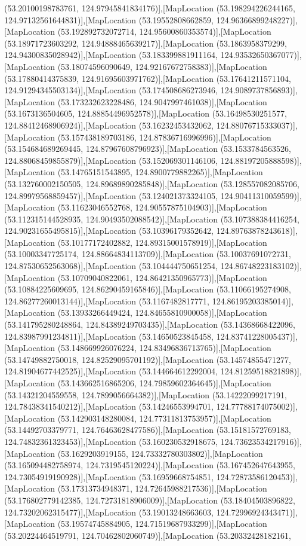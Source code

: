 (53.20100198783761, 124.97945841834176)],[MapLocation (53.198294226244165, 124.97132561644831)],[MapLocation (53.19552808662859, 124.96366899248227)],[MapLocation (53.192892732072714, 124.95600860353574)],[MapLocation (53.18971723603292, 124.94888465639217)],[MapLocation (53.1863958379299, 124.94300835028942)],[MapLocation (53.183399881911164, 124.93532650367077)],[MapLocation (53.18074596090649, 124.92167672758383)],[MapLocation (53.17880414375839, 124.91695603971762)],[MapLocation (53.17641211571104, 124.91294345503134)],[MapLocation (53.174508686273946, 124.9089737856893)],[MapLocation (53.173232623228486, 124.9047997461038)],[MapLocation (53.1673136504605, 124.88854496952578)],[MapLocation (53.16498530251577, 124.88412468906924)],[MapLocation (53.16232453432062, 124.88076715333037)],[MapLocation (53.157438189703186, 124.87836716996996)],[MapLocation (53.154684689269445, 124.87967608796923)],[MapLocation (53.1533784563526, 124.88068459855879)],[MapLocation (53.152069301146106, 124.88197205888598)],[MapLocation (53.14765151543895, 124.8900779882265)],[MapLocation (53.132760002150505, 124.89689890285848)],[MapLocation (53.128557082085706, 124.89979568859457)],[MapLocation (53.124021373324105, 124.90411310059599)],[MapLocation (53.11623046552768, 124.90557875104903)],[MapLocation (53.112315144528935, 124.90493502088542)],[MapLocation (53.107388384416254, 124.90231655495815)],[MapLocation (53.10396179352642, 124.89763878243618)],[MapLocation (53.10177172402882, 124.89315001578919)],[MapLocation (53.10003347725174, 124.88664834113709)],[MapLocation (53.10037691072731, 124.87530652563068)],[MapLocation (53.104444750651254, 124.86748223183102)],[MapLocation (53.10709040822061, 124.86421350965773)],[MapLocation (53.10884225609695, 124.86290459165846)],[MapLocation (53.11066195274908, 124.86277260013144)],[MapLocation (53.1167482817771, 124.86195203385014)],[MapLocation (53.13933266449424, 124.84655810900058)],[MapLocation (53.141795280248864, 124.84389249703435)],[MapLocation (53.14368668422096, 124.83987991234811)],[MapLocation (53.14650523845458, 124.83741228005437)],[MapLocation (53.148669926076224, 124.83496836713765)],[MapLocation (53.14749882750018, 124.82529095701192)],[MapLocation (53.14574855471277, 124.81904677442525)],[MapLocation (53.144664612292004, 124.81259518821898)],[MapLocation (53.143662516865206, 124.79859602364645)],[MapLocation (53.14321204559558, 124.7899056664382)],[MapLocation (53.14222099217191, 124.78438341540212)],[MapLocation (53.14246553994701, 124.77788174075002)],[MapLocation (53.142903148280084, 124.77311813753957)],[MapLocation (53.14492703379771, 124.76463628477586)],[MapLocation (53.15181572769183, 124.74832361323453)],[MapLocation (53.160230532918675, 124.73623534217916)],[MapLocation (53.1629203919155, 124.73332780303802)],[MapLocation (53.165094482758974, 124.7319545120224)],[MapLocation (53.167452647643955, 124.73054919190928)],[MapLocation (53.16959668754851, 124.72873586120453)],[MapLocation (53.17313734948371, 124.72645988217536)],[MapLocation (53.176802779142385, 124.72731818906009)],[MapLocation (53.18404503896822, 124.73202062315477)],[MapLocation (53.19013248663603, 124.72996924343471)],[MapLocation (53.19574745884905, 124.71519687933299)],[MapLocation (53.20224464519791, 124.70462802060749)],[MapLocation (53.20332428182161, 